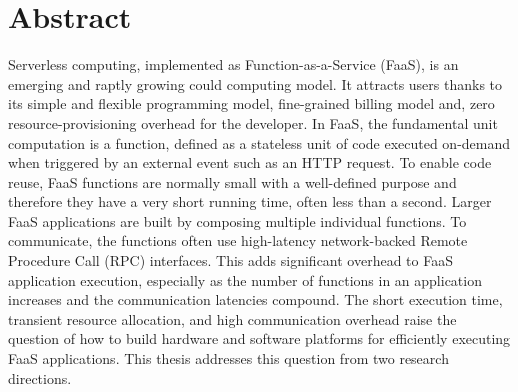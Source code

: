 \documentclass[../main.tex]{subfiles}
\begin{document}
\chapter{Abstract}


Serverless computing, implemented as Function-as-a-Service (FaaS), is
an emerging and raptly growing could computing model. It attracts
users thanks to its simple and flexible programming model,
fine-grained billing model and, zero resource-provisioning overhead
for the developer. In FaaS, the fundamental unit computation is a
function, defined as a stateless unit of code executed on-demand when
triggered by an external event such as an HTTP request. To enable
code reuse, FaaS functions are normally small with a well-defined
purpose and therefore they have a very short running time, often less
than a second. Larger FaaS applications are built by composing
multiple individual functions. To communicate, the functions often use
high-latency network-backed Remote Procedure Call (RPC)
interfaces. This adds significant overhead to FaaS application
execution, especially as the number of functions in an application
increases and the communication latencies compound. The short execution
time, transient resource allocation, and high communication overhead
raise the question of how to build hardware and software platforms
for efficiently executing FaaS applications. This thesis addresses
this question from two research directions.
\end{document}
